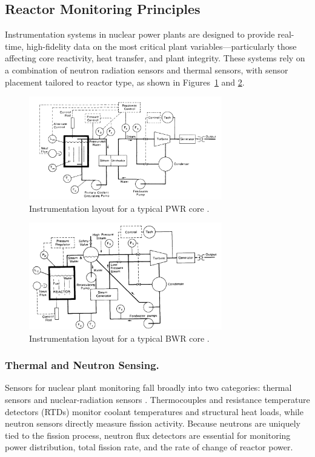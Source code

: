 \documentclass[12pt]{article}
\begin{document}
\subsection{Reactor Monitoring Principles}

Instrumentation systems in nuclear power plants are designed to provide real-time, high-fidelity data on the most critical plant variables—particularly those affecting core reactivity, heat transfer, and plant integrity. These systems rely on a combination of neutron radiation sensors and thermal sensors, with sensor placement tailored to reactor type, as shown in Figures~\ref{fig:coreinstrumentation} and \ref{fig:bwrinstrumentation}.

\begin{figure}[H]
  \centering
  \includegraphics[width=0.75\textwidth]{instrumentation}
  \caption{Instrumentation layout for a typical PWR core \cite{nuctech}.}
  \label{fig:coreinstrumentation}
\end{figure}

\begin{figure}[H]
  \centering
  \includegraphics[width=0.75\textwidth]{bwr}
  \caption{Instrumentation layout for a typical BWR core \cite{nuctech}.}
  \label{fig:bwrinstrumentation}
\end{figure}

\subsubsection{Thermal and Neutron Sensing.}
Sensors for nuclear plant monitoring fall broadly into two categories: thermal sensors and nuclear-radiation sensors \cite{ichandbook}. Thermocouples and resistance temperature detectors (RTDs) monitor coolant temperatures and structural heat loads, while neutron sensors directly measure fission activity. Because neutrons are uniquely tied to the fission process, neutron flux detectors are essential for monitoring power distribution, total fission rate, and the rate of change of reactor power.
\end{document}
